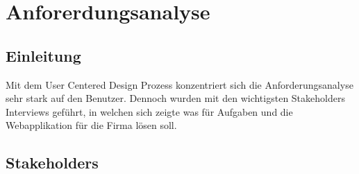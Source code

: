 \chapter{Anforerdungsanalyse}
\label{sec:anforderungsanalyse}


\section{Einleitung}
Mit dem User Centered Design Prozess konzentriert sich die Anforderungsanalyse sehr stark auf den Benutzer. Dennoch wurden mit den wichtigsten Stakeholders Interviews geführt, in welchen sich zeigte was für Aufgaben und die Webapplikation für die Firma lösen soll.


\section{Stakeholders}
